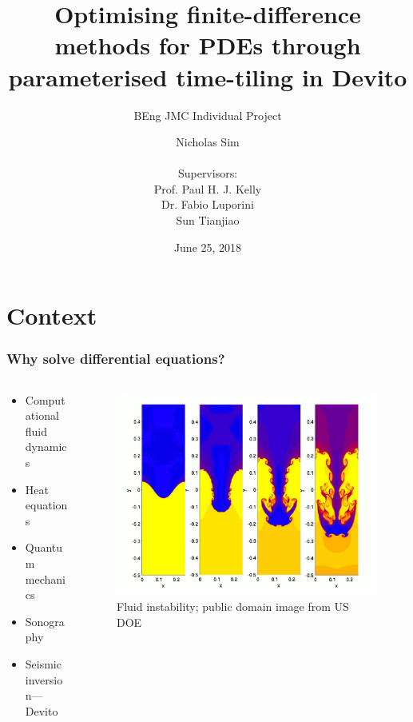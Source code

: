 \documentclass{beamer}
\begin{document}
\title{Optimising finite-difference methods for PDEs through parameterised time-tiling in Devito}
\subtitle{BEng JMC Individual Project}

\author{Nicholas Sim\\
~\\
{\normalsize Supervisors:}\\
Prof. Paul H. J. Kelly\\
Dr. Fabio Luporini\\
Sun Tianjiao}

\date{June 25, 2018}

\frame{\titlepage}



\section{Context}


\begin{frame}
\frametitle{Why solve differential equations?}

\begin{columns}
\begin{column}{.48\textwidth}
\begin{itemize}
	\item Computational fluid dynamics
	\item Heat equations
	\item Quantum mechanics
	\item Sonography
	\item Seismic inversion---Devito
\end{itemize}
\end{column}

\begin{column}{.48\textwidth}
\begin{center}
\begin{figure}
	\includegraphics[width=\textwidth]{fluid-instability.png}
	\caption{\scriptsize Fluid instability; public domain image from US DOE}
\end{figure}
\end{center}
\end{column}
\end{columns}
\end{frame}
\end{document}
